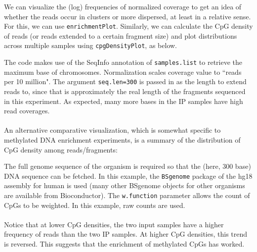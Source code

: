 \documentclass[a4paper, 12pt]{article}
\begin{document}
We can visualize the (log) frequencies of normalized coverage to get an idea of whether the reads occur in clusters or more dispersed, at least in a relative sense.  For this, we can use \texttt{enrichmentPlot}.  Similarly, we can calculate the CpG density of reads (or reads extended to a certain fragment size) and plot distributions across multiple samples using \texttt{cpgDensityPlot}, as below.



\noindent The code makes use of the SeqInfo annotation of \texttt{samples.list} to retrieve the maximum base of chromosomes.  Normalization scales coverage value to ``reads per 10 million". The argument \texttt{seq.len=300} is passed in as the length to extend reads to, since that is approximately the real length of the fragments sequenced in this experiment. As expected, many more bases in the IP samples have high read coverages. \\
\ \\
An alternative comparative visualization, which is somewhat specific to methylated DNA enrichment experiments, is a summary of the distribution of CpG density among reads/fragments:



\noindent The full genome sequence of the organism is required so that the (here, 300 base) DNA sequence can be fetched. In this example, the \texttt{BSgenome} package of the hg18 assembly for human is used (many other BSgenome objects for other organisms are available from Bioconductor). The \texttt{w.function} parameter allows the count of CpGs to be weighted. In this example, raw counts are used.
\ \\ \ \\
Notice that at lower CpG densities, the two input samples have a higher frequency of reads than the two IP samples. At higher CpG densities, this trend is reversed. This suggests that the enrichment of methylated CpGs has worked.
\ \\ \ \\
\end{document}
